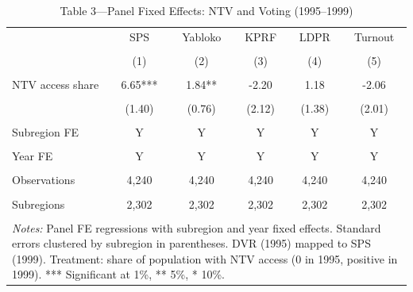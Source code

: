 \begin{table}[htbp]
\centering
\caption{Table 3---Panel Fixed Effects: NTV and Voting (1995--1999)}
\label{tab:table3}
\begin{tabular}{lccccc}
\toprule
 & SPS & Yabloko & KPRF & LDPR & Turnout \\\\
 & (1) & (2) & (3) & (4) & (5) \\\\
\midrule
NTV access share
  & 6.65*** & 1.84** & -2.20 & 1.18 & -2.06 \\\\
  & (1.40) & (0.76) & (2.12) & (1.38) & (2.01) \\\\
\addlinespace
Subregion FE & Y & Y & Y & Y & Y \\\\
Year FE & Y & Y & Y & Y & Y \\\\
\addlinespace
Observations & 4,240 & 4,240 & 4,240 & 4,240 & 4,240 \\\\
Subregions & 2,302 & 2,302 & 2,302 & 2,302 & 2,302 \\\\
\bottomrule
\multicolumn{6}{p{0.95\linewidth}}{\footnotesize
 \textit{Notes:} Panel FE regressions with subregion and year fixed effects.
 Standard errors clustered by subregion in parentheses.
 DVR (1995) mapped to SPS (1999). Treatment: share of population
 with NTV access (0 in 1995, positive in 1999).
 *** Significant at 1\%, ** 5\%, * 10\%.}
\end{tabular}
\end{table}
